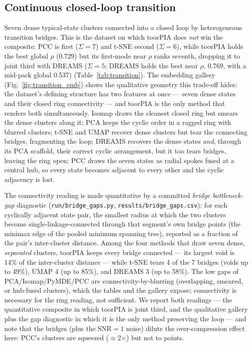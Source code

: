\documentclass[11pt]{article}
\begin{document}
\subsection{Continuous closed-loop transition}
\label{sec:transition}



Seven dense typical-state clusters connected into a closed loop by
heterogeneous transition bridges. This is the dataset on which toorPIA does
\emph{not} win the composite: PCC is first ($\Sigma{=}7$) and t-SNE second
($\Sigma{=}6$), while toorPIA holds the best global $\rho$ (0.729) but its
first-mode near $\rho$ ranks seventh, dropping it to joint third with DREAMS
($\Sigma{=}5$; DREAMS holds the best near $\rho$, 0.769, with a mid-pack
global 0.537) (Table~\ref{tab:transition}). The embedding gallery
(Fig.~\ref{fig:transition_emb}) shows the qualitative geometry this trade-off
hides: the dataset's defining structure has two features at once --- seven
dense states and their closed ring connectivity --- and toorPIA is the only
method that renders both simultaneously. Isomap draws the cleanest closed ring
but smears the dense clusters along it; PCA keeps the cyclic order in a ragged
ring with blurred clusters; t-SNE and UMAP recover dense clusters but tear the
connecting bridges, fragmenting the loop; DREAMS recovers the dense states
\emph{and}, through its PCA scaffold, their correct cyclic arrangement, but
it too tears bridges, leaving the ring open; PCC draws the seven states as radial
spokes fused at a central hub, so every state becomes adjacent to every other
and the cyclic adjacency is lost.

The connectivity reading is made quantitative by a committed
\emph{bridge bottleneck-gap} diagnostic (\texttt{run/bridge\_gaps.py},
\texttt{results/bridge\_gaps.csv}): for each cyclically adjacent state pair,
the smallest radius at which the two clusters become single-linkage-connected
through that segment's own bridge points (the minimax edge of the pooled
minimum spanning tree), reported as a fraction of the pair's inter-cluster
distance. Among the four methods that draw seven dense, \emph{separated}
clusters, toorPIA keeps every bridge connected --- its largest void is 14\%
of the inter-cluster distance --- while t-SNE tears 4 of the 7 bridges (voids
up to 49\%), UMAP 4 (up to 85\%), and DREAMS 3 (up to 58\%). The low gaps of
PCA/Isomap/PyMDE/PCC are connectivity-by-blurring (overlapping, smeared, or
hub-fused clusters), which the tables and the gallery expose; connectivity is
necessary for the ring reading, not sufficient. We report both readings ---
the quantitative
composite in which toorPIA is joint third, and the qualitative gallery plus
the gap diagnostic in which it is
the only method preserving the loop --- and note that the bridges (plus the
SNR${=}1$ noise) dilute the over-compression effect here: PCC's clusters are
squeezed ($\approx$2$\times$) but not to points.
\end{document}
